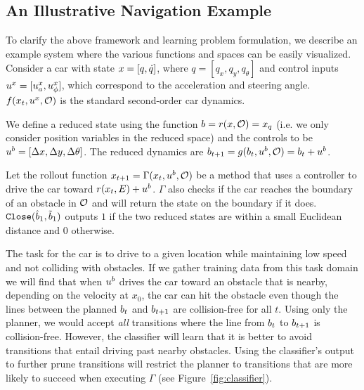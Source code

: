 \subsection{An Illustrative Navigation Example}

\label{sec:car_example}
To clarify the above framework and learning problem formulation, we describe an example system where the various functions and spaces can be easily visualized. Consider a car with state $x = [q,\dot{q}]$, where $q = [q_x,q_y,q_\theta]$ and control inputs $u^x = [u^x_a,u^x_\phi]$, which correspond to the acceleration and steering angle. $f(x_t,u^x,\mathcal{O})$ is the standard second-order car dynamics. 

We define a reduced state using the function $b = r(x,\mathcal{O}) = x_q$ (i.e. we only consider position variables in the reduced space) and the controls to be $u^b = [\Delta x,\Delta y, \Delta \theta ]$. The reduced dynamics are $b_{t+1} = g(b_t,u^b,\mathcal{O}) = b_t + u^b$.

Let the rollout function $x_{t+1} = \Gamma(x_t,u^b,\mathcal{O})$ be a method that uses a controller to drive the car toward $r(x_t,E) + u^b$. $\Gamma$ also checks if the car reaches the boundary of an obstacle in $\mathcal{O}$ and will return the state on the boundary if it does. $\texttt{Close}(\hat{b}_1,\tilde{b}_1)$ outputs $1$ if the two reduced states are within a small Euclidean distance and $0$ otherwise. 

The task for the car is to drive to a given location while maintaining low speed and not colliding with obstacles. If we gather training data from this task domain we will find that when $u^b$ drives the car toward an obstacle that is nearby, depending on the velocity at $x_0$, the car can hit the obstacle even though the lines between the planned $b_t$ and $b_{t+1}$ are collision-free for all $t$. Using only the planner, we would accept \textit{all} transitions where the line from $b_t$ to $b_{t+1}$ is collision-free. However, the classifier will learn that it is better to avoid transitions that entail driving past nearby obstacles. Using the classifier's output to further prune transitions will restrict the planner to transitions that are more likely to succeed when executing $\Gamma$ (see Figure~\ref{fig:classifier}).

